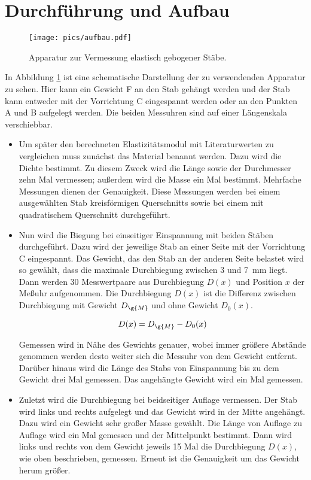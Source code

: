 \section{Durchführung und Aufbau}
\label{sec:Durchführung}

\begin{figure}[h]
  \centering
  \texttt{[image: pics/aufbau.pdf]}
  \caption{Apparatur zur Vermessung elastisch gebogener Stäbe\cite{anleitung}.}
  \label{fig:aufbau}
\end{figure}

In Abbildung \ref{fig:aufbau} ist eine schematische Darstellung der zu
verwendenden Apparatur zu sehen. Hier kann ein Gewicht F an den Stab gehängt
werden und der Stab kann entweder mit der Vorrichtung C eingespannt werden oder
an den Punkten A und B aufgelegt werden. Die beiden Messuhren sind auf einer
Längenskala verschiebbar.

\begin{itemize}
  \item Um später den berechneten Elastizitätsmodul mit Literaturwerten zu
  vergleichen muss zunächst das Material benannt werden.
  Dazu wird die Dichte bestimmt. Zu diesem Zweck wird die Länge sowie der
  Durchmesser zehn Mal vermessen; außerdem wird die Masse ein Mal bestimmt.
  Mehrfache Messungen dienen der Genauigkeit.
  Diese Messungen werden bei einem ausgewählten Stab kreisförmigen
  Querschnitts sowie bei einem mit quadratischem Querschnitt durchgeführt.

  \item Nun wird die Biegung bei einseitiger Einspannung mit beiden
  Stäben durchgeführt. Dazu wird der jeweilige Stab an einer Seite mit der
  Vorrichtung C eingespannt. Das Gewicht, das den Stab an der anderen
  Seite belastet wird so gewählt, dass die maximale Durchbiegung zwischen
  3 und \SI{7}{\milli\meter} liegt.
  Dann werden 30 Messwertpaare aus Durchbiegung $D(x)$ und Position $x$ der Meßuhr
  aufgenommen. Die Durchbiegung $D(x)$ ist die Differenz zwischen
  Durchbiegung mit Gewicht $D_{\g{M}}$ und ohne Gewicht $D_0(x)$.

  \begin{equation*}
    D(x) = D_{\g{M}} - D_0(x)
  \end{equation*}

  Gemessen wird in Nähe des Gewichts genauer, wobei immer größere Abstände
  genommen werden desto weiter sich die Messuhr von dem Gewicht entfernt.
  Darüber hinaus wird die Länge des Stabs von Einspannung bis zu dem
  Gewicht drei Mal gemessen. Das angehängte Gewicht wird ein Mal gemessen.

  \item Zuletzt wird die Durchbiegung bei beidseitiger Auflage vermessen.
  Der Stab wird links und rechts aufgelegt und das Gewicht wird in der Mitte
  angehängt. Dazu wird ein Gewicht sehr großer Masse gewählt. Die Länge
  von Auflage zu Auflage wird ein Mal gemessen und der Mittelpunkt
  bestimmt. Dann wird links und rechts von dem Gewicht jeweils 15 Mal
  die Durchbiegung $D(x)$, wie oben beschrieben, gemessen. Erneut ist
  die Genauigkeit um das Gewicht herum größer.


\end{itemize}
